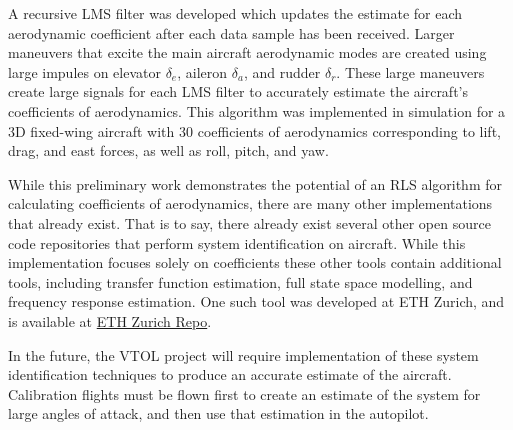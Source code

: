 A recursive LMS filter was developed which updates the estimate for each aerodynamic coefficient after each data sample has been received.
Larger maneuvers that excite the main aircraft aerodynamic modes are created using large impules on elevator $\delta_e$, aileron $\delta_a$, and rudder $\delta_r$.
These large maneuvers create large signals for each LMS filter to accurately estimate the aircraft's coefficients of aerodynamics.
This algorithm was implemented in simulation for a 3D fixed-wing aircraft with 30 coefficients of aerodynamics corresponding to lift, drag, and east forces, as well as roll, pitch, and yaw.

While this preliminary work demonstrates the potential of an RLS algorithm for calculating coefficients of aerodynamics, there are many other implementations that already exist.
That is to say, there already exist several other open source code repositories that perform system identification on aircraft. 
While this implementation focuses solely on coefficients these other tools contain additional tools, including transfer function estimation, full state space modelling, and frequency response estimation.
One such tool was developed at ETH Zurich, and is available at \href{https://github.com/ethz-asl/data-driven-dynamics}{ETH Zurich Repo}.

In the future, the VTOL project will require implementation of these system identification techniques to produce an accurate estimate of the aircraft.
Calibration flights must be flown first to create an estimate of the system for large angles of attack, and then use that estimation in the autopilot.
